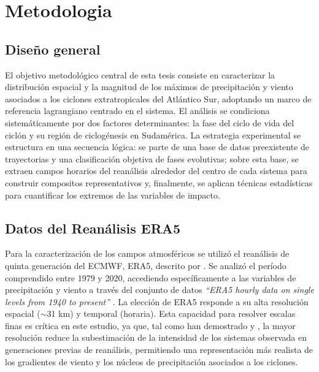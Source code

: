 \chapter{Metodologia}\label{cap:metodologia}


\section{Diseño general}\label{sec:diseno_general}

El objetivo metodológico central de esta tesis consiste en caracterizar la distribución espacial y la magnitud de los máximos de precipitación y viento asociados a los ciclones extratropicales del Atlántico Sur, adoptando un marco de referencia lagrangiano centrado en el sistema. El análisis se condiciona sistemáticamente por dos factores determinantes: la fase del ciclo de vida del ciclón y su región de ciclogénesis en Sudamérica. La estrategia experimental se estructura en una secuencia lógica: se parte de una base de datos preexistente de trayectorias y una clasificación objetiva de fases evolutivas; sobre esta base, se extraen campos horarios del reanálisis alrededor del centro de cada sistema para construir compositos representativos y, finalmente, se aplican técnicas estadísticas para cuantificar los extremos de las variables de impacto.


\section{Datos del Reanálisis ERA5}\label{sec:datos_era5}

Para la caracterización de los campos atmosféricos se utilizó el reanálisis de quinta generación del ECMWF, ERA5, descrito por \citet{hersbach2020era5}. Se analizó el período comprendido entre 1979 y 2020, accediendo específicamente a las variables de precipitación y viento a través del conjunto de datos \textit{``ERA5 hourly data on single levels from 1940 to present''} \citep{hersbach_era5_2023b}. La elección de ERA5 responde a su alta resolución espacial ($\sim$31 km) y temporal (horaria). Esta capacidad para resolver escalas finas es crítica en este estudio, ya que, tal como han demostrado \citet{priestley2022improved} y \citet{dalanhese2023new}, la mayor resolución reduce la subestimación de la intensidad de los sistemas observada en generaciones previas de reanálisis, permitiendo una representación más realista de los gradientes de viento y los núcleos de precipitación asociados a los ciclones.

